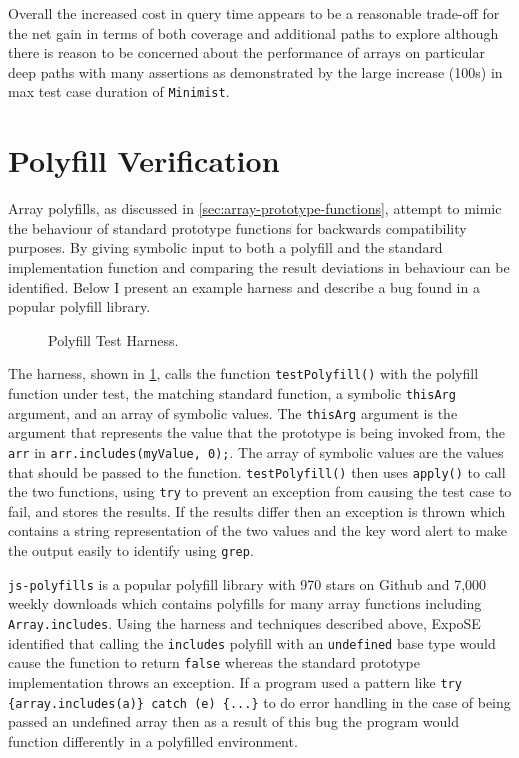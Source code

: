 \documentclass[]{final_report}
\begin{document}
Overall the increased cost in query time appears to be a reasonable trade-off for the net gain in terms of both coverage and additional paths to explore although there is reason to be concerned about the performance of arrays on particular deep paths with many assertions as demonstrated by the large increase (100s) in max test case duration of \lstinline|Minimist|.

\section{Polyfill Verification}
Array polyfills, as discussed in \ref{sec:array-prototype-functions}, attempt to mimic the behaviour of standard prototype functions for backwards compatibility purposes. By giving symbolic input to both a polyfill and the standard implementation function and comparing the result deviations in behaviour can be identified. Below I present an example harness and describe a bug found in a popular polyfill library.

\begin{figure}[t]

\caption{\label{fig:polyfill-test-harness} Polyfill Test Harness.}
\end{figure}

The harness, shown in \ref{fig:polyfill-test-harness}, calls the function \lstinline|testPolyfill()| with the polyfill function under test, the matching standard function, a symbolic \lstinline|thisArg| argument, and an array of symbolic values. The \lstinline|thisArg| argument is the argument that represents the value that the prototype is being invoked from, the \lstinline|arr| in \lstinline|arr.includes(myValue, 0);|. The array of symbolic values are the values that should be passed to the function. \lstinline|testPolyfill()| then uses \lstinline|apply()| to call the two functions, using \lstinline|try| to prevent an exception from causing the test case to fail, and stores the results. If the results differ then an exception is thrown which contains a string representation of the two values and the key word alert to make the output easily to identify using \lstinline|grep|.

\lstinline|js-polyfills| is a popular polyfill library with 970 stars on Github and 7,000 weekly downloads which contains polyfills for many array functions including \lstinline|Array.includes|. Using the harness and techniques described above, ExpoSE identified that calling the \lstinline|includes| polyfill with an \lstinline|undefined| base type would cause the function to return \lstinline|false| whereas the standard prototype implementation throws an exception. If a program used a pattern like \lstinline|try {array.includes(a)} catch (e) {...}| to do error handling in the case of being passed an undefined array then as a result of this bug the program would function differently in a polyfilled environment.
\end{document}

